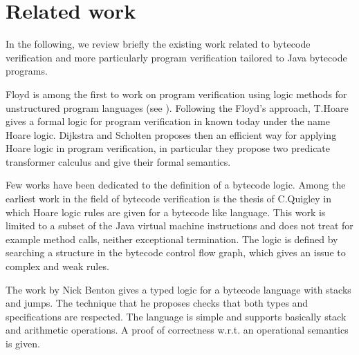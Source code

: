 \section{Related work} \label{relWorkWp}

In the following, we review briefly the existing work related to bytecode verification
 and more particularly program verification tailored to Java bytecode programs. 

 Floyd is among the first to work on program verification using logic methods for unstructured program
 languages (see \cite{F67amp}). Following the Floyd's approach, T.Hoare gives a formal logic for program verification in \cite{Hoare69ABC} known
 today under the name Hoare logic. Dijkstra and Scholten \cite{WPCDS} proposes then an efficient way for applying Hoare logic in
 program verification, in particular they propose two predicate transformer calculus and give their formal semantics. 

 

   

Few works have been dedicated to the definition of a bytecode logic. Among the earliest work in the field of bytecode verification 
is the thesis of C.Quigley  \cite{Quigley03PLJ} in which Hoare logic rules are given for a bytecode like language. This work is limited 
to a subset of the Java virtual machine instructions and does not treat for example method calls,
 neither exceptional termination. The logic is defined by searching a structure in the bytecode control flow graph,
 which gives an issue to complex and weak rules.

The work by Nick Benton \cite{B04tlsj} gives a  typed logic for a bytecode language with stacks and jumps. 
The technique that he proposes checks that both types and specifications are respected.
The language is simple and supports basically stack and arithmetic operations. A proof of correctness
w.r.t. an operational semantics is given.

